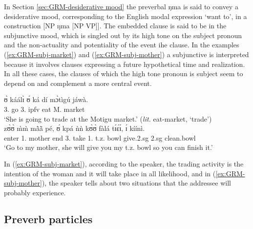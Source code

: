 \begin{exe}
\begin{exe}
\begin{exe}
{\begin{exe}
\begin{exe}
\begin{exe}
\begin{exe}
\begin{exe}
\begin{exe}
\begin{exe}
\begin{exe}
\begin{exe}
\begin{exe}
\begin{exe}
\begin{exe}
\begin{exe}
\begin{exe}
\begin{exe}
\begin{exe}
\begin{exe}
\begin{exe}
\begin{exe}
In Section \ref{sec:GRM-desiderative mood} the preverbal {\sls ŋma}  is said to  convey a 
desiderative mood,  corresponding to the English modal expression `want to',  in a construction [NP 
{\sls ŋma} [NP VP]].  The embedded clause is said to be in the subjunctive mood, which is singled 
out by its high tone on the subject pronoun and  the non-actuality and potentiality of the event 
ihe clause.  In the examples (\ref{ex:GRM-subj-market}) and (\ref{ex:GRM-subj-mother}) a  
subjunctive is interpreted because it involves clauses expressing a future hypothetical time and 
realization. In all these cases, the clauses of which the high tone pronoun is subject seem to 
depend on and complement a more central event.

\ea
\ea\label{ex:GRM-subj-market}
\gll   ʊ̀ káálɪ̀ ʊ́ ká dí mɔ̀tìgú jáwà.\\
 {3.\sg} go  {3.\sg} {\sc ipfv} eat M. market \\
\glt `She is going to trade at the Motigu market.' ({\it lit.} eat-market,  `trade')\\

 
\ex\label{ex:GRM-subj-mother}
\gll zʊ̀ʊ̀ m̀m̀ mã̀ã̀ pé, ʊ́ kpá ǹǹ kʊ̀ʊ̀ fàlá tɪ́ɛ́ɪ́, ɪ́ kíínì.\\
 enter   {1.\sg} mother end  {3.\sg} take    {1.\sg\poss} t.z. bowl give.{\sc 2.sg} {\sc 
2.sg} clean.bowl\\
\glt `Go to my mother, she will give you my t.z. bowl so you can finish it.'\\

 \z
 \z
 
 In  (\ref{ex:GRM-subj-market}), according to the speaker, the trading activity is the intention of 
the woman and it will take place in all likelihood, and 
 in  (\ref{ex:GRM-subj-mother}),  the speaker tells about two situations that the 
addressee  will 
probably experience. 



\subsection{Preverb particles}
\label{sec:GRM-precerv}


\end{exe}
\end{exe}
\end{exe}
\end{exe}
\end{exe}
\end{exe}
\end{exe}
\end{exe}
\end{exe}
\end{exe}
\end{exe}
\end{exe}
\end{exe}
\end{exe}
\end{exe}
\end{exe}
\end{exe}
\end{exe}
\end{exe}}
\end{exe}
\end{exe}
\end{exe}
